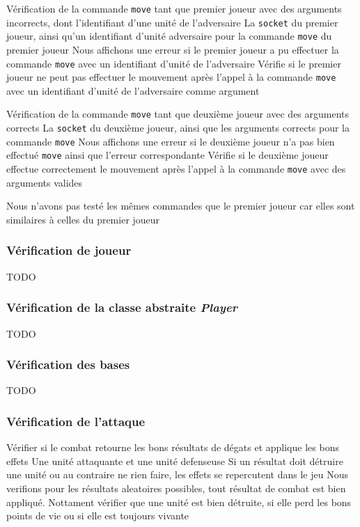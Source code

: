 \mytest
{Vérification de la commande {\tt move} tant que premier joueur avec des arguments incorrects, dont l'identifiant d'une unité de l'adversaire}
{La {\tt socket} du premier joueur, ainsi qu'un identifiant d'unité adversaire pour la commande {\tt move} du premier joueur}
{Nous affichons une erreur si le premier joueur a pu effectuer la commande {\tt move} avec un identifiant d'unité de l'adversaire}
{Vérifie si le premier joueur ne peut pas effectuer le mouvement après l'appel à la commande {\tt move} avec un identifiant d'unité de l'adversaire comme argument}

\mytest
{Vérification de la commande {\tt move} tant que deuxième joueur avec des arguments corrects}
{La {\tt socket} du deuxième joueur, ainsi que les arguments corrects pour la commande {\tt move}}
{Nous affichons une erreur si le deuxième joueur n'a pas bien effectué {\tt move} ainsi que l'erreur correspondante}
{Vérifie si le deuxième joueur effectue correctement le mouvement après l'appel à la commande {\tt move} avec des arguments valides}

Nous n'avons pas testé les mêmes commandes que le premier joueur car elles sont similaires à celles du premier joueur



\subsubsection{Vérification de joueur}

TODO

\subsubsection{Vérification de la classe abstraite \emph{Player}}

TODO

\subsubsection{Vérification des bases}

TODO

\subsubsection{Vérification de l'attaque}

\mytest
{Vérifier si le combat retourne les bons résultats de dégats et applique les bons effets}
{Une unité attaquante et une unité defenseuse}
{Si un résultat doit détruire une unité ou au contraire ne rien faire, les effets se repercutent dans le jeu}
{Nous verifions pour les résultats aleatoires possibles, tout résultat de combat est bien appliqué. Nottament vérifier
que une unité est bien détruite, si elle perd les bons points de vie ou si elle est toujours vivante}

